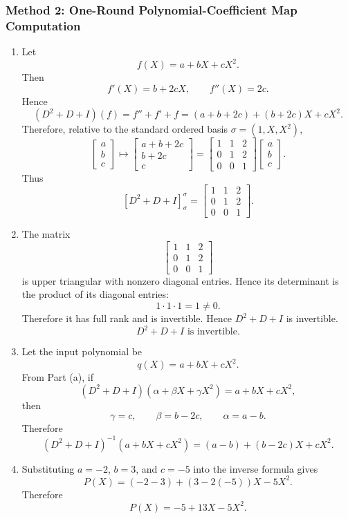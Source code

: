 \documentclass[12pt]{article}
\begin{document}
\subsubsection{Method 2: One-Round Polynomial-Coefficient Map Computation}
\begin{enumerate}[label=(\alph*)]
  \item Let
  \[
    f(X)=a+bX+cX^2.
  \]
  Then
  \[
    f'(X)=b+2cX,
    \qquad
    f''(X)=2c.
  \]
  Hence
  \[
    (D^2+D+I)(f)
    =
    f''+f'+f
    =
    (a+b+2c)+(b+2c)X+cX^2.
  \]
  Therefore, relative to the standard ordered basis $\sigma=(1,X,X^2)$,
  \[
    \begin{bmatrix}
      a\\b\\c
    \end{bmatrix}
    \mapsto
    \begin{bmatrix}
      a+b+2c\\
      b+2c\\
      c
    \end{bmatrix}
    =
    \begin{bmatrix}
      1&1&2\\
      0&1&2\\
      0&0&1
    \end{bmatrix}
    \begin{bmatrix}
      a\\b\\c
    \end{bmatrix}.
  \]
  Thus
  \[
    \boxed{[D^2+D+I]_{\sigma}^{\sigma}
    =
    \begin{bmatrix}
      1&1&2\\
      0&1&2\\
      0&0&1
    \end{bmatrix}.}
  \]

  \item The matrix
  \[
    \begin{bmatrix}
      1&1&2\\
      0&1&2\\
      0&0&1
    \end{bmatrix}
  \]
  is upper triangular with nonzero diagonal entries. Hence its determinant is the product of its diagonal entries:
  \[
    1\cdot 1\cdot 1=1\ne 0.
  \]
  Therefore it has full rank and is invertible. Hence $D^2+D+I$ is invertible.
  \[
    \boxed{D^2+D+I\text{ is invertible}.}
  \]

  \item Let the input polynomial be
  \[
    q(X)=a+bX+cX^2.
  \]
  From Part (a), if
  \[
    (D^2+D+I)(\alpha+\beta X+\gamma X^2)=a+bX+cX^2,
  \]
  then
  \[
    \gamma=c,\qquad \beta=b-2c,\qquad \alpha=a-b.
  \]
  Therefore
  \[
    \boxed{
    (D^2+D+I)^{-1}(a+bX+cX^2)
    =
    (a-b)+(b-2c)X+cX^2.}
  \]

  \item Substituting $a=-2$, $b=3$, and $c=-5$ into the inverse formula gives
  \[
    P(X)=(-2-3)+(3-2(-5))X-5X^2.
  \]
  Therefore
  \[
    \boxed{P(X)=-5+13X-5X^2.}
  \]
\end{enumerate}
\end{document}
